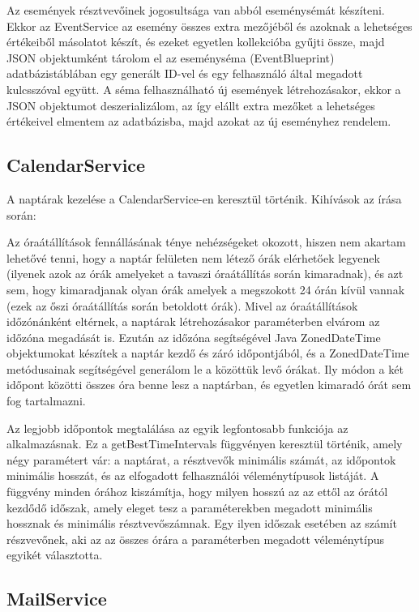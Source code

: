 \documentclass[a4paper,12pt]{report}
\theoremstyle{definition}
\theoremstyle{remark}
\begin{document}
Az események résztvevőinek jogosultsága van abból eseménysémát készíteni. Ekkor az EventService az esemény összes extra mezőjéből és azoknak a lehetséges értékeiből másolatot készít, és ezeket egyetlen kollekcióba gyűjti össze, majd JSON objektumként tárolom el az eseményséma (EventBlueprint) adatbázistáblában egy generált ID-vel és egy felhasználó által megadott kulcsszóval együtt. A séma felhasználható új események létrehozásakor, ekkor a JSON objektumot deszerializálom, az így elállt extra mezőket a lehetséges értékeivel elmentem az adatbázisba, majd azokat az új eseményhez rendelem.

\subsection{CalendarService}

A naptárak kezelése a CalendarService-en keresztül történik. Kihívások az írása során:

Az óraátállítások fennállásának ténye nehézségeket okozott, hiszen nem akartam lehetővé tenni, hogy a naptár felületen nem létező órák elérhetőek legyenek (ilyenek azok az órák amelyeket a tavaszi óraátállítás során kimaradnak), és azt sem, hogy kimaradjanak olyan órák amelyek a megszokott 24 órán kívül vannak (ezek az őszi óraátállítás során betoldott órák). Mivel az óraátállítások időzónánként eltérnek, a naptárak létrehozásakor paraméterben elvárom az időzóna megadását is. Ezután az időzóna segítségével Java ZonedDateTime objektumokat készítek a naptár kezdő és záró időpontjából, és a ZonedDateTime metódusainak segítségével generálom le a közöttük levő órákat. Ily módon a két időpont közötti összes óra benne lesz a naptárban, és egyetlen kimaradó órát sem fog tartalmazni.

Az legjobb időpontok megtalálása az egyik legfontosabb funkciója az alkalmazásnak. Ez a getBestTimeIntervals függvényen keresztül történik, amely négy paramétert vár: a naptárat, a résztvevők minimális számát, az időpontok minimális hosszát, és az elfogadott felhasználói véleménytípusok listáját. A függvény minden órához kiszámítja, hogy milyen hosszú az az ettől az órától kezdődő időszak, amely eleget tesz a paraméterekben megadott minimális hossznak és minimális résztvevőszámnak. Egy ilyen időszak esetében az számít részvevőnek, aki az az összes órára a paraméterben megadott véleménytípus egyikét választotta.

\subsection{MailService}
\end{document}
